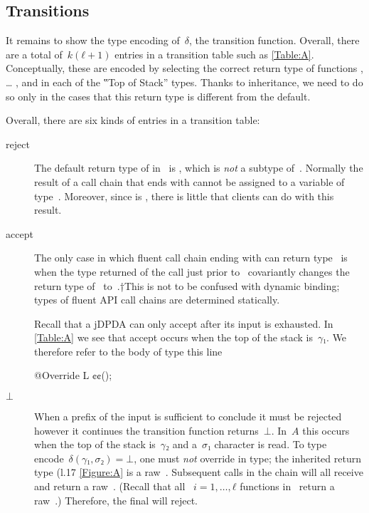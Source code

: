 \subsection{Transitions}
It remains to show the type encoding of~$δ$,
  the transition function.
Overall, there are a total of~$k(ℓ+1)$
  entries in a transition table such as \cref{Table:A}.
Conceptually, these are encoded by selecting the correct return
  type of functions , … , and \cc{\$()} in each of the ‟Top of Stack” types.
Thanks to inheritance, we need to do so only in the cases that this return type is different from the
  default.

Overall, there are six kinds of entries in a transition table:
\begin{description}
  \item[\textsf{reject}]
  The default return type of \cc{\$()} in~ is , which
  is \emph{not} a subtype of~. Normally the result of a call chain that ends with \cc{\$()}
  cannot be assigned to a variable of type~. Moreover, since  is ,
  there is little that clients can do with this result.
  \item[\textsf{accept}]
  The only case in which fluent call chain ending with \cc{\$()} can return
    type~ is when the type returned of the call just prior to~ covariantly
    changes the return type of~\cc{\$()} to~.†{This is not to be confused with dynamic binding;
  types of fluent API call chains are determined statically.}
  \par
  Recall that a jDPDA can only accept after its input is exhausted.
  In \cref{Table:A} we see that \textsf{accept} occurs when the top of the stack is~$γ₁$.
  We therefore refer to the body of type  this line
  \begin{JAVA}
@Override L ¢\gobble$¢$();
  \end{JAVA}
  \item[$⊥$]
  When a prefix of the input is sufficient to conclude it must be rejected however it continues
  the transition function returns~$⊥$.
  In~$A$ this occurs when the top of the stack is~$γ₂$ and a~$σ₁$ character is read.
  To type encode~$δ(γ₁,σ₂) =⊥$, one must \emph{not} override  in type;
  the inherited return type (l.17 \cref{Figure:A} is a raw~.
  Subsequent calls in the chain will all receive and return a raw~.
  (Recall that all ~$i=1,…,ℓ$ functions in~ return a raw~.)
  Therefore, the final \cc{\$()} will reject.

\end{description}
